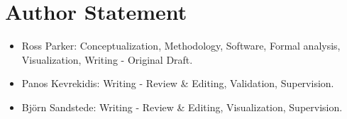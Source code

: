 \documentclass[12pt]{article}
\begin{document}
\section*{Author Statement}

\begin{itemize}

\item Ross Parker: Conceptualization, Methodology, Software, Formal analysis, Visualization, Writing - Original Draft. 

\item Panos Kevrekidis: Writing - Review & Editing, Validation, Supervision. 

\item Bj{\"o}rn Sandstede: Writing - Review & Editing, Visualization, Supervision.

\end{itemize}
\end{document}
